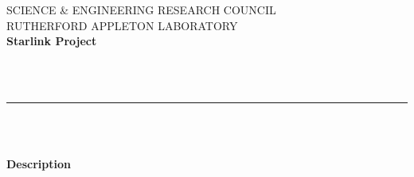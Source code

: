 \newcommand{\sstbugs}[1]{\item[Bugs:] #1}

\newcommand{\sstitemlist}[1]{
  \mbox{} \\
  \vspace{-3.5ex}
  \begin{itemize}
     #1
  \end{itemize}
}

\newcommand{\sstitem}{\item}




\newcommand{\noteroutine}[2]{{\small \bf #1} \nopagebreak \\
                             \hspace*{3em} {\em #2} \\[1.5ex]}




\thispagestyle{empty}
SCIENCE \& ENGINEERING RESEARCH COUNCIL \hfill \stardocname\\
RUTHERFORD APPLETON LABORATORY\\
{\large\bf Starlink Project\\}
{\large\bf \stardoccategory\ \stardocnumber}
\begin{flushright}
\stardocauthors\\
\stardocdate
\end{flushright}
\vspace{-4mm}
\rule{\textwidth}{0.5mm}
\vspace{5mm}
\begin{center}
{\Huge\bf  \stardoctitle \\ [2.5ex]}
{\LARGE\bf \stardocversion \\ [4ex]}
{\Huge\bf  \stardocmanual}
\end{center}
\vspace{20mm}

\begin{center}
{\Large\bf Description}
\end{center}

